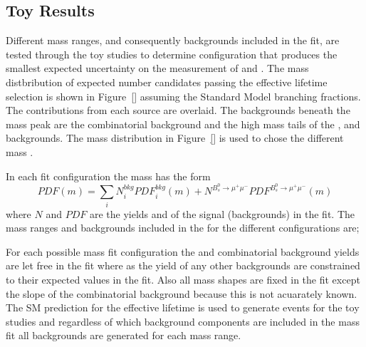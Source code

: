 {   
\subsection{Toy Results}
\label{sec:toyresults}

Different mass ranges, and consequently backgrounds included in the \ml fit, are tested through the toy studies to determine configuration that produces the smallest expected uncertainty on the measurement of \tmumu and \Gmumu.
The mass distbribution of expected number \bsmumu candidates passing the effective lifetime selection is shown in Figure~\ref{} assuming the Standard Model \bmumu branching fractions. The contributions from each source are overlaid. The backgrounds beneath the \bs mass peak are the combinatorial background and the high mass tails of the \bhh, \bdmum and \lambdab backgrounds. The mass distribution in Figure~\ref{} is used to chose the different mass \pdfs.

In each fit configuration the mass \pdf has the form
\begin{equation}
PDF(m) = \displaystyle\sum_{i} N^{bkg}_{i}PDF^{bkg}_{i}(m) + N^{B^{0}_{s} \to \mu^{+} \mu^{-}}PDF^{B^{0}_{s} \to \mu^{+} \mu^{-}}(m)
\end{equation}
where $N$ and $PDF$ are the yields and \pdfs of the signal (backgrounds) in the fit. The mass ranges and backgrounds included in the \pdf for the different configurations are;


For each possible mass fit configuration the \bsmumu and combinatorial background yields are let free in the fit where as the yield of any other backgrounds are constrained to their expected values in the fit. Also all mass shapes are fixed in the \ml fit except the slope of the combinatorial background because this is not acuarately known.
The SM prediction for the \bsmumu effective lifetime is used to generate events for the toy studies and regardless of which background components are included in the mass fit all backgrounds are generated for each mass range. 

}
